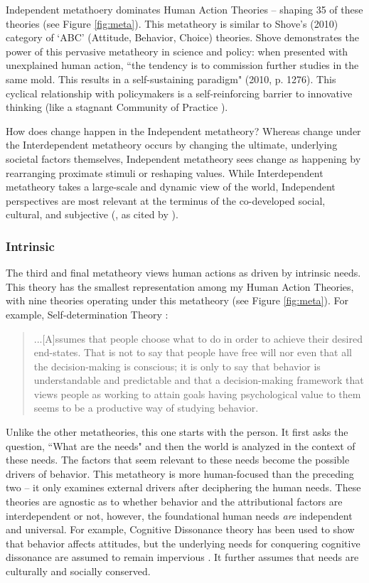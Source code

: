 \documentclass[12 pt]{article}
\begin{document}
	Independent metathoery dominates Human Action Theories -- shaping 35 of these theories (see Figure \ref{fig:meta}).
	This metatheory is similar to Shove's (2010) category of `ABC' (Attitude, Behavior, Choice) theories. Shove demonstrates the power of this pervasive metatheory in science and policy: when presented with unexplained human action, ``the tendency is to commission further studies in the same mold. This results in a self-sustaining paradigm" (2010, p. 1276). This cyclical relationship with policymakers is a self-reinforcing barrier to innovative thinking (like a stagnant Community of Practice \parencite{Wenger1998}). 
	
	How does change happen in the Independent metatheory? Whereas change under the Interdependent metatheory occurs by changing the ultimate, underlying societal factors themselves, Independent metatheory sees change as happening by rearranging proximate stimuli or reshaping values. While Interdependent metatheory takes a large-scale and dynamic view of the world, Independent perspectives are most relevant at the terminus of the co-developed social, cultural, and subjective (\textcite{Uzzell2008}, as cited by \textcite{Shove2010}). 

	\subsubsection{Intrinsic}
	The third and final metatheory views human actions as driven by intrinsic needs. This theory has the smallest representation among my Human Action Theories, with nine theories operating under this metatheory (see Figure \ref{fig:meta}). For example, Self-determination Theory \parencite[][p. 132-3]{Deci1976}:  \blockquote{...[A]ssumes that people choose what to
		do in order to achieve their desired end-states. That is not to say that
		people have free will nor even that all the decision-making is conscious;
		it is only to say that behavior is understandable and predictable and that
		a decision-making framework that views people as working to attain goals having psychological value to them seems to be a productive way of studying behavior.} 
	 Unlike the other metatheories, this one starts with the person. It first asks the question, ``What are the needs" and then the world is analyzed in the context of these needs. The factors that seem relevant to these needs become the possible drivers of behavior. This metatheory is more human-focused than the preceding two -- it only examines external drivers after deciphering the human needs. These theories are agnostic as to whether behavior and the attributional factors are interdependent or not, however, the foundational human needs \textit{are} independent and universal. For example, Cognitive Dissonance theory has been used to show that behavior affects attitudes, but the underlying needs for conquering cognitive dissonance are assumed to remain impervious \parencite{Festinger1959}. It further assumes that needs are culturally and socially conserved. 
	 
\end{document}
